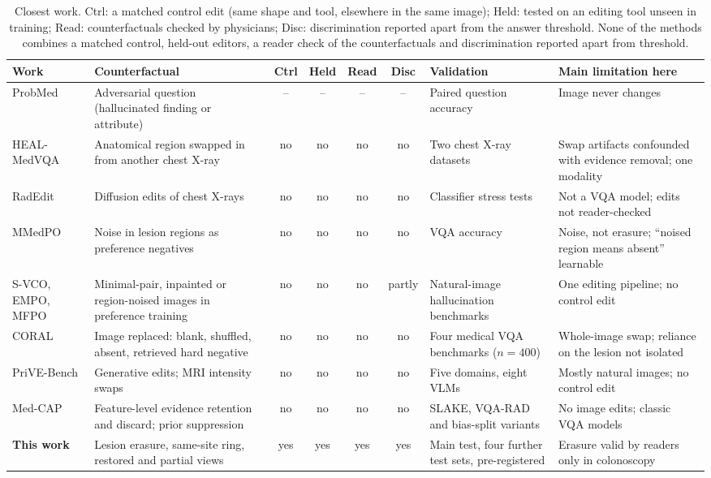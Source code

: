 \documentclass{article} %
\begin{document}
\begin{table}[t]
\caption{Closest work. Ctrl: a matched control edit (same shape and tool, elsewhere in the same image); Held: tested on an editing tool unseen in training; Read: counterfactuals checked by physicians; Disc: discrimination reported apart from the answer threshold. None of the methods combines a matched control, held-out editors, a reader check of the counterfactuals and discrimination reported apart from threshold.}
\label{tab:related}
\begin{center}
\scriptsize
\setlength{\tabcolsep}{3pt}
\begin{adjustbox}{max width=\linewidth}
\begin{tabular}{L{2.2cm}L{2.9cm}cccc L{2.0cm}L{2.6cm}}
\toprule
\textbf{Work} & \textbf{Counterfactual} & \textbf{Ctrl} & \textbf{Held} & \textbf{Read} & \textbf{Disc} & \textbf{Validation} & \textbf{Main limitation here} \\
\midrule
ProbMed \citep{yan2024probmed} & Adversarial question (hallucinated finding or attribute) & -- & -- & -- & -- & Paired question accuracy & Image never changes \\
HEAL-MedVQA \citep{healmedvqa2024} & Anatomical region swapped in from another chest X-ray & no & no & no & no & Two chest X-ray datasets & Swap artifacts confounded with evidence removal; one modality \\
RadEdit \citep{perez2024radedit} & Diffusion edits of chest X-rays & no & no & no & no & Classifier stress tests & Not a VQA model; edits not reader-checked \\
MMedPO \citep{zhu2024mmedpo} & Noise in lesion regions as preference negatives & no & no & no & no & VQA accuracy & Noise, not erasure; ``noised region means absent'' learnable \\
S-VCO, EMPO, MFPO \citep{svco2024,wu2025empo,jiang2025mfpo} & Minimal-pair, inpainted or region-noised images in preference training & no & no & no & partly & Natural-image hallucination benchmarks & One editing pipeline; no control edit \\
CORAL \citep{zafar2026coral} & Image replaced: blank, shuffled, absent, retrieved hard negative & no & no & no & no & Four medical VQA benchmarks ($n = 400$) & Whole-image swap; reliance on the lesion not isolated \\
PriVE-Bench \citep{sun2026prive} & Generative edits; MRI intensity swaps & no & no & no & no & Five domains, eight VLMs & Mostly natural images; no control edit \\
Med-CAP \citep{huang2026medcap} & Feature-level evidence retention and discard; prior suppression & no & no & no & no & SLAKE, VQA-RAD and bias-split variants & No image edits; classic VQA models \\
\textbf{This work} & Lesion erasure, same-site ring, restored and partial views & yes & yes & yes & yes & Main test, four further test sets, pre-registered & Erasure valid by readers only in colonoscopy \\
\bottomrule
\end{tabular}
\end{adjustbox}
\end{center}
\end{table}
\end{document}
